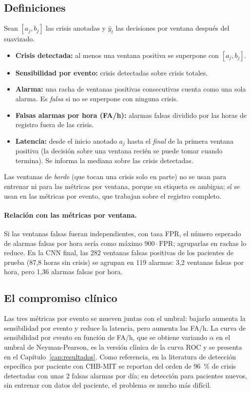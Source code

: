 \subsection{Definiciones}

Sean $[a_j, b_j]$ las crisis anotadas y $\hat y_t$ las decisiones por ventana después del suavizado.
\begin{itemize}
  \item \textbf{Crisis detectada:} al menos una ventana positiva se superpone con $[a_j, b_j]$.
  \item \textbf{Sensibilidad por evento:} crisis detectadas sobre crisis totales.
  \item \textbf{Alarma:} una racha de ventanas positivas consecutivas cuenta como una sola alarma. Es \emph{falsa} si no
        se superpone con ninguna crisis.
  \item \textbf{Falsas alarmas por hora (FA/h):} alarmas falsas dividido por las horas de registro fuera de las crisis.
  \item \textbf{Latencia:} desde el inicio anotado $a_j$ hasta el \emph{final} de la primera ventana positiva (la decisión
        sobre una ventana recién se puede tomar cuando termina). Se informa la mediana sobre las crisis detectadas.
\end{itemize}
Las ventanas de \emph{borde} (que tocan una crisis solo en parte) no se usan para entrenar ni para las métricas por
ventana, porque su etiqueta es ambigua; sí se usan en las métricas por evento, que trabajan sobre el registro completo.

\paragraph{Relación con las métricas por ventana.} Si las ventanas falsas fueran independientes, con tasa FPR, el
número esperado de alarmas falsas por hora sería como máximo $900\cdot\text{FPR}$; agruparlas en rachas lo reduce. En la
CNN final, las 282 ventanas falsas positivas de los pacientes de prueba (87,8 horas sin crisis) se agrupan en 119
alarmas: 3,2 ventanas falsas por hora, pero 1,36 alarmas falsas por hora.

\subsection{El compromiso clínico}

Las tres métricas por evento se mueven juntas con el umbral: bajarlo aumenta la sensibilidad por evento y reduce la
latencia, pero aumenta las FA/h. La curva de sensibilidad por evento en función de FA/h, que se obtiene variando
$\alpha$ en el umbral de Neyman-Pearson, es la versión clínica de la curva ROC y se presenta en el
Capítulo~\ref{cap:resultados}. Como referencia, en la literatura de detección específica por paciente con CHB-MIT
\parencite{shoeb2009} se reportan del orden de 96~\% de crisis detectadas con unas 2 falsas alarmas por día; en
detección para pacientes nuevos, sin entrenar con datos del paciente, el problema es mucho más difícil.

